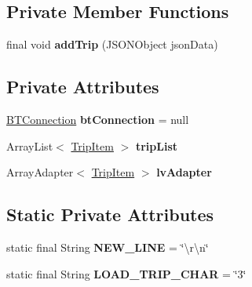\subsection*{Private Member Functions}
\begin{DoxyCompactItemize}
\item 
\mbox{\label{classcom_1_1jack_1_1motorbikestatistics_1_1_load_device_fragment_a23957dbe1518052c7167d86938a14c35}} 
final void {\bfseries add\+Trip} (J\+S\+O\+N\+Object json\+Data)
\end{DoxyCompactItemize}
\subsection*{Private Attributes}
\begin{DoxyCompactItemize}
\item 
\mbox{\label{classcom_1_1jack_1_1motorbikestatistics_1_1_load_device_fragment_a7a446c4528638e9d169481c3ff1471b0}} 
\hyperlink{classcom_1_1jack_1_1motorbikestatistics_1_1_b_t_connection}{B\+T\+Connection} {\bfseries bt\+Connection} = null
\item 
\mbox{\label{classcom_1_1jack_1_1motorbikestatistics_1_1_load_device_fragment_a92be11df86dfe159ecbdaff59e526464}} 
Array\+List$<$ \hyperlink{classcom_1_1jack_1_1motorbikestatistics_1_1_trip_item}{Trip\+Item} $>$ {\bfseries trip\+List}
\item 
\mbox{\label{classcom_1_1jack_1_1motorbikestatistics_1_1_load_device_fragment_a3ccc43db37a3b6d9a7dc345e9ab78d6b}} 
Array\+Adapter$<$ \hyperlink{classcom_1_1jack_1_1motorbikestatistics_1_1_trip_item}{Trip\+Item} $>$ {\bfseries lv\+Adapter}
\end{DoxyCompactItemize}
\subsection*{Static Private Attributes}
\begin{DoxyCompactItemize}
\item 
\mbox{\label{classcom_1_1jack_1_1motorbikestatistics_1_1_load_device_fragment_aca212e892559df75e77d2d24870195e1}} 
static final String {\bfseries N\+E\+W\+\_\+\+L\+I\+NE} = \char`\"{}\textbackslash{}r\textbackslash{}n\char`\"{}
\item 
\mbox{\label{classcom_1_1jack_1_1motorbikestatistics_1_1_load_device_fragment_a484328e2963103665fae8801557bef73}} 
static final String {\bfseries L\+O\+A\+D\+\_\+\+T\+R\+I\+P\+\_\+\+C\+H\+AR} = \char`\"{}3\char`\"{}
\end{DoxyCompactItemize}


